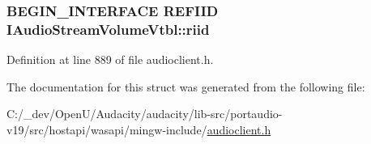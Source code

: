 \subsubsection[{\texorpdfstring{riid}{riid}}]{\setlength{\rightskip}{0pt plus 5cm}B\+E\+G\+I\+N\+\_\+\+I\+N\+T\+E\+R\+F\+A\+CE {\bf R\+E\+F\+I\+ID} I\+Audio\+Stream\+Volume\+Vtbl\+::riid}\hypertarget{struct_i_audio_stream_volume_vtbl_aa0b28249abbeee71ae2b852d9950b4ff}{}\label{struct_i_audio_stream_volume_vtbl_aa0b28249abbeee71ae2b852d9950b4ff}


Definition at line 889 of file audioclient.\+h.



The documentation for this struct was generated from the following file\+:\begin{DoxyCompactItemize}
\item 
C\+:/\+\_\+dev/\+Open\+U/\+Audacity/audacity/lib-\/src/portaudio-\/v19/src/hostapi/wasapi/mingw-\/include/\hyperlink{audioclient_8h}{audioclient.\+h}\end{DoxyCompactItemize}
